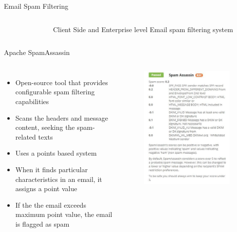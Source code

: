 \documentclass[nobackground,dvipsnames,table,aspectratio=169]{beamer}
\begin{document}
\begin{frame}{Email Spam Filtering}
\begin{columns}
\begin{figure}
            \end{figure}
            Client Side and Enterprise level Email spam filtering system
    \end{columns}
\end{frame}

\begin{frame}{Apache SpamAssassin}
    \begin{columns}
            \begin{itemize}
                \item Open-source tool that provides configurable spam filtering capabilities
                \item Scans the headers and message content, seeking the spam-related texts
                \item Uses a points based system
                \item When it finds particular characteristics in an email, it assigns a point value
                \item If the the email exceeds maximum point value, the email is flagged as spam
            \end{itemize}
            \begin{figure}
                \centering
                \includegraphics[width=\textwidth]{spam-assassin}
            \end{figure}
    \end{columns}
\end{frame}
\end{document}
